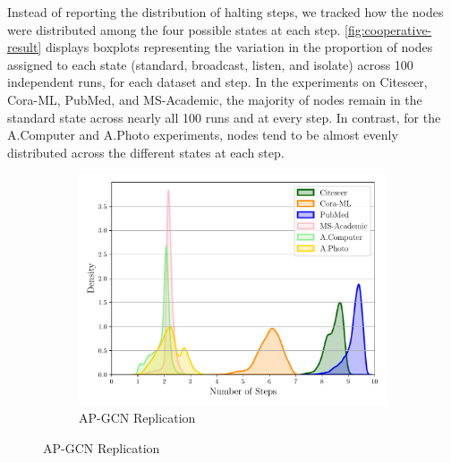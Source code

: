 \documentclass{gdl}
\begin{document}
Instead of reporting the distribution of halting steps, we tracked how the nodes were distributed among the four possible states at each step. \autoref{fig:cooperative-result} displays boxplots representing the variation in the proportion of nodes assigned to each state (standard, broadcast, listen, and isolate) across 100 independent runs, for each dataset and step. In the experiments on Citeseer, Cora-ML, PubMed, and MS-Academic, the majority of nodes remain in the standard state across nearly all 100 runs and at every step. In contrast, for the A.Computer and A.Photo experiments, nodes tend to be almost evenly distributed across the different states at each step.

\begin{figure}[p]
    \centering
    \begin{minipage}[t]{0.48\textwidth}
        \centering
        \begin{subfigure}[b]{0.8\textwidth}
            \centering
            \includegraphics[width=\textwidth]{Spinelli_steps_distribution.pdf}
            \captionsetup{justification=centerlast}
            \caption{AP-GCN Replication}
            \label{fig:step_dist_AP_GCN}
        \end{subfigure}
        

\end{minipage}
\end{figure}
\end{document}

